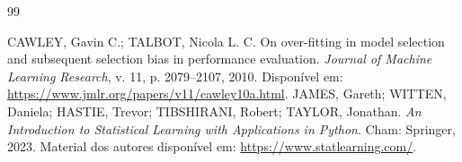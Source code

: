 \begin{thebibliography}{99}
CAWLEY, Gavin C.; TALBOT, Nicola L. C. On over-fitting in model selection and subsequent selection bias in performance evaluation. \textit{Journal of Machine Learning Research}, v. 11, p. 2079--2107, 2010. Disponível em: \url{https://www.jmlr.org/papers/v11/cawley10a.html}.
JAMES, Gareth; WITTEN, Daniela; HASTIE, Trevor; TIBSHIRANI, Robert; TAYLOR, Jonathan. \textit{An Introduction to Statistical Learning with Applications in Python}. Cham: Springer, 2023. Material dos autores disponível em: \url{https://www.statlearning.com/}.
\end{thebibliography}
